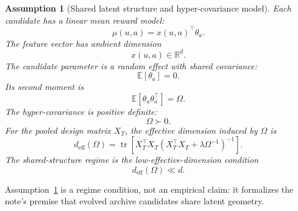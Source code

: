 \documentclass{article} %
\newtheorem{assumption}{Assumption}
\begin{document}
\begin{assumption}[Shared latent structure and hyper-covariance model]
\label{assump:shared-structure}
Each candidate has a linear mean reward model:
\begin{equation}
\label{eq:hyper-linear-model}
\mu(u,a)
=
x(u,a)^{\top}\theta_a.
\end{equation}
The feature vector has ambient dimension
\begin{equation}
\label{eq:hyper-feature-dim}
x(u,a)\in\mathbb{R}^{d}.
\end{equation}
The candidate parameter is a random effect with shared covariance:
\begin{equation}
\label{eq:hyper-random-effect}
\mathbb{E}[\theta_a]
=
0.
\end{equation}
Its second moment is
\begin{equation}
\label{eq:hyper-covariance}
\mathbb{E}[\theta_a\theta_a^{\top}]
=
\Omega.
\end{equation}
The hyper-covariance is positive definite:
\begin{equation}
\label{eq:hyper-pd}
\Omega\succ 0.
\end{equation}
For the pooled design matrix \(X_T\), the effective dimension induced by \(\Omega\) is
\begin{equation}
\label{eq:hyper-deff}
d_{\mathrm{eff}}(\Omega)
=
\operatorname{tr}
\!\left[
X_T^{\top}X_T
\left(
X_T^{\top}X_T+\lambda\Omega^{-1}
\right)^{-1}
\right].
\end{equation}
The shared-structure regime is the low-effective-dimension condition
\begin{equation}
\label{eq:hyper-low-deff}
d_{\mathrm{eff}}(\Omega)
\ll
d.
\end{equation}
\end{assumption}

Assumption~\ref{assump:shared-structure} is a regime condition, not an empirical claim: it formalizes the note's premise that evolved archive candidates share latent geometry.
\end{document}
